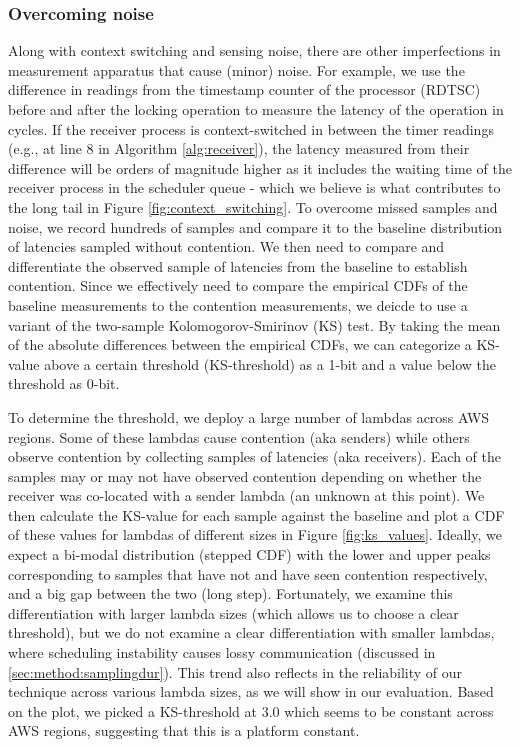 \subsubsection{Overcoming noise} 
\label{sec:method:noise}
Along with context switching and sensing noise, there are other imperfections in
measurement apparatus that cause (minor) noise. For example, we use the
difference in readings from the timestamp counter of the processor (RDTSC) 
before and after the locking operation to measure the latency of the operation in
cycles. If the receiver process is context-switched in between the timer
readings (e.g., at line 8 in Algorithm \ref{alg:receiver}), the latency measured
from their difference will be orders of magnitude higher as it includes the
waiting time of the receiver process in the scheduler queue - which we believe
is what contributes to the long tail in Figure \ref{fig:context_switching}. To
overcome missed samples and noise, we record hundreds of samples and compare it
to the baseline distribution of latencies sampled without contention. We then
need to compare and differentiate the observed sample of latencies from the
baseline to establish contention. Since we effectively need to compare the
empirical CDFs of the baseline measurements to the contention measurements, we
deicde to use a variant of the two-sample Kolomogorov-Smirinov (KS) test. By
taking the mean of the absolute differences between the empirical CDFs, we can
categorize a KS-value above a certain threshold (KS-threshold) as a 1-bit and 
a value below the threshold as 0-bit.

To determine the threshold, we deploy a large number of lambdas across AWS
regions. Some of these lambdas cause contention (aka senders) while others
observe contention by collecting samples of latencies (aka receivers). Each of
the samples may or may not have observed contention depending on whether the
receiver was co-located with a sender lambda (an unknown at this point). We then
calculate the KS-value for each sample against the baseline and plot a CDF of
these values for lambdas of different sizes in Figure \ref{fig:ks_values}.
Ideally, we expect a bi-modal distribution (stepped CDF) with the lower and
upper peaks corresponding to samples that have not and have seen contention
respectively, and a big gap between the two (long step). Fortunately, we examine
this differentiation with larger lambda sizes (which allows us to choose a clear
threshold), but we do not examine a clear differentiation with smaller lambdas,
where scheduling instability causes lossy communication (discussed in
\ref{sec:method:samplingdur}).  This trend also reflects in the reliability of
our technique across various lambda sizes, as we will show in our evaluation.
Based on the plot, we picked a KS-threshold at 3.0 which seems to be constant
across AWS regions, suggesting that this is a platform constant.

